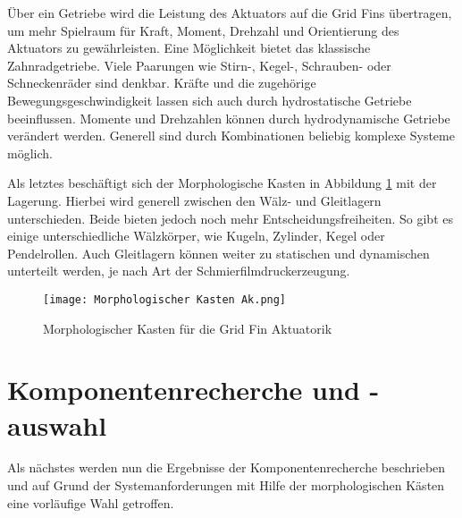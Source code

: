 Über ein Getriebe wird die Leistung des Aktuators auf die Grid Fins übertragen, um mehr Spielraum für Kraft, Moment, Drehzahl und Orientierung des Aktuators zu gewährleisten. Eine Möglichkeit bietet das klassische Zahnradgetriebe. Viele Paarungen wie Stirn-, Kegel-, Schrauben- oder Schneckenräder sind denkbar. Kräfte und die zugehörige Bewegungsgeschwindigkeit lassen sich auch durch hydrostatische Getriebe beeinflussen. Momente und Drehzahlen können durch hydrodynamische Getriebe verändert werden. Generell sind durch Kombinationen beliebig komplexe Systeme möglich.

Als letztes beschäftigt sich der Morphologische Kasten in Abbildung \ref{abb_MorphKastAk} mit der Lagerung. Hierbei wird generell zwischen den Wälz- und Gleitlagern unterschieden. Beide bieten jedoch noch mehr Entscheidungsfreiheiten. So gibt es einige unterschiedliche Wälzkörper, wie Kugeln, Zylinder, Kegel oder Pendelrollen. Auch Gleitlagern können weiter zu statischen und dynamischen unterteilt werden, je nach Art der Schmierfilmdruckerzeugung.
\begin{figure}[h]
	\centering
	\texttt{[image: Morphologischer Kasten Ak.png]}
	\caption{Morphologischer Kasten für die Grid Fin Aktuatorik}
	\label{abb_MorphKastAk}
\end{figure}
\newpage
\section{Komponentenrecherche und -auswahl}
Als nächstes werden nun die Ergebnisse der Komponentenrecherche beschrieben und auf Grund der Systemanforderungen mit Hilfe der morphologischen Kästen eine vorläufige Wahl getroffen.
